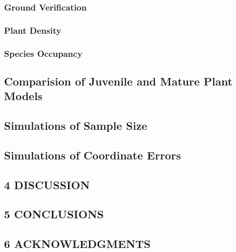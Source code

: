 \documentclass[
]{article}
\begin{document}
\hypertarget{ground-verification-1}{%
\subsubsection{Ground Verification}\label{ground-verification-1}}

\hypertarget{plant-density-1}{%
\subsubsection{Plant Density}\label{plant-density-1}}

\hypertarget{species-occupancy-1}{%
\subsubsection{Species Occupancy}\label{species-occupancy-1}}

\hypertarget{comparision-of-juvenile-and-mature-plant-models-1}{%
\subsection{Comparision of Juvenile and Mature Plant
Models}\label{comparision-of-juvenile-and-mature-plant-models-1}}

\hypertarget{simulations-of-sample-size-1}{%
\subsection{Simulations of Sample
Size}\label{simulations-of-sample-size-1}}

\hypertarget{simulations-of-coordinate-errors-1}{%
\subsection{Simulations of Coordinate
Errors}\label{simulations-of-coordinate-errors-1}}

\hypertarget{discussion}{%
\subsection{4 \textbar{} DISCUSSION}\label{discussion}}

\hypertarget{conclusions}{%
\subsection{5 \textbar{} CONCLUSIONS}\label{conclusions}}

\hypertarget{acknowledgments}{%
\subsection{6 \textbar{} ACKNOWLEDGMENTS}\label{acknowledgments}}
\end{document}
